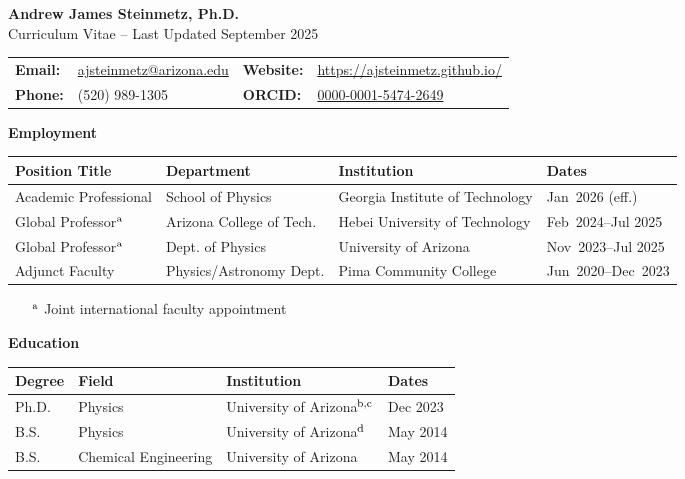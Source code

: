 \documentclass[11pt]{article}
\begin{document}
\begin{center}
    {\Large\textbf{Andrew James Steinmetz, Ph.D.}}\\[0.5em]
    {\large Curriculum Vitae -- Last Updated September 2025}
\end{center}

{\normalsize
\begin{center}
    \begin{tabular}{@{}p{2.0cm} p{5.0cm} p{2.0cm} p{5.0cm}@{}}
        \textbf{Email:} & \href{mailto:ajsteinmetz@arizona.edu}{ajsteinmetz@arizona.edu} &
        \textbf{Website:} & \href{https://ajsteinmetz.github.io/}{https://ajsteinmetz.github.io/} \\
        \textbf{Phone:} & (520) 989-1305 &
        \textbf{ORCID:} & \href{https://orcid.org/0000-0001-5474-2649}{0000-0001-5474-2649} \\
    \end{tabular}
\end{center}
}

\medskip

{\Large\textbf{Employment}}

{\normalsize
\begin{tabular}{@{}p{3.8cm} p{4.4cm} p{5.3cm} p{3.0cm}@{}}
    \toprule
    \textbf{Position Title} & \textbf{Department} & \textbf{Institution} & \textbf{Dates} \\
    \midrule
    Academic Professional & School of Physics & Georgia Institute of Technology & {\small Jan~2026 (eff.)} \\ 
    Global Professor\(^{\rm a}\) & Arizona College of Tech. & Hebei University of Technology & {\small Feb~2024--Jul 2025} \\
    Global Professor\(^{\rm a}\) & Dept. of Physics & University of Arizona              & {\small Nov~2023--Jul 2025} \\
    Adjunct Faculty  & Physics/Astronomy Dept. & Pima Community College       & {\small Jun~2020--Dec~2023} \\
    \bottomrule
\end{tabular}
}

\begin{itemize}[leftmargin=*,nosep]
    \item[\(^{\rm a}\)] {\small Joint international faculty appointment}
\end{itemize}

\medskip

{\Large\textbf{Education}}

{\normalsize
\begin{tabular}{@{}p{2.8cm} p{5.0cm} p{5.5cm} p{3.2cm}@{}}
    \toprule
    \textbf{Degree} & \textbf{Field} & \textbf{Institution} & \textbf{Dates} \\
    \midrule
    Ph.D. & Physics             & University of Arizona\(^{\rm b,c}\) & Dec 2023 \\
    B.S.   & Physics             & University of Arizona\(^{\rm d}\) & May 2014 \\
    B.S.   & Chemical Engineering& University of Arizona & May 2014 \\
    \bottomrule
\end{tabular}
}
\end{document}
